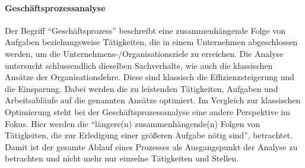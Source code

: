 \paragraph{Geschäftsprozessanalyse}
Der Begriff \enquote{Geschäftsprozess} beschreibt eine zusammenhängende Folge von Aufgaben beziehungsweise Tätigkeiten, die in einem Unternehmen abgeschlossen werden, um die Unternehmens-/Organisationsziele zu erreichen. Die Analyse untersucht schlussendlich dieselben Sachverhalte, wie auch die klassischen Ansätze der Organisationslehre. \autocite[vgl.][S.\,5]{staud_geschaftsprozessanalyse_2006} Diese sind klassisch die Effizienzsteigerung und die Einsparung. Dabei werden die zu leistenden Tätigkeiten, Aufgaben und Arbeitsabläufe auf die genannten Ansätze optimiert. Im Vergleich zur klassischen Optimierung steht bei der Geschäftsprozessanalyse eine andere Perspektive im Fokus. Hier werden die \enquote{längere(n) zusammenhängende(n) Folgen von Tätigkeiten, die zur Erledigung einer größeren Aufgabe nötig sind}\autocite[][S.\,5]{staud_geschaftsprozessanalyse_2006}, betrachtet. Damit ist der gesamte Ablauf eines Prozesses als Ausgangspunkt der Analyse zu betrachten und nicht mehr nur einzelne Tätigkeiten und Stellen.
\par 
